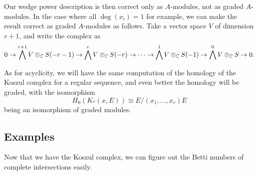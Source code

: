 \documentclass[12pt]{article}
\begin{document}
Our wedge power description is then correct only as $A$-modules, not as graded $A$-modules. In the case where all $\deg(x_i)=1$ for example, we can make the result correct as graded $A$-modules as follows. Take a vector space $V$ of dimension $r+1$, and write the complex as
\[0\to \bigwedge^{r+1} V \otimes_{\mathbb{C}} S(-r-1) \to \bigwedge^r V \otimes_{\mathbb{C}} S(-r) \to \cdots \to \bigwedge^1 V \otimes_{\mathbb{C}} S(-1) \to \bigwedge^0 V\otimes_{\mathbb{C}} S \to 0.\]

As for acyclicity, we will have the same computation of the homology of the Koszul complex for a regular sequence, and even better the homology will be graded, with the isomorphism
\[H_0(K_*(x,E)) \cong E/(x_1,\dots,x_r)E\]
being an isomorphism of graded modules.

\subsection{Examples}

Now that we have the Koszul complex, we can figure out the Betti numbers of complete intersections easily.
\end{document}
